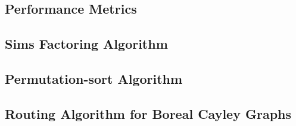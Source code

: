 \subsection{Performance Metrics}
\subsection{Sims Factoring Algorithm}
\subsection{Permutation-sort Algorithm}
\subsection{Routing Algorithm for Boreal Cayley Graphs}
